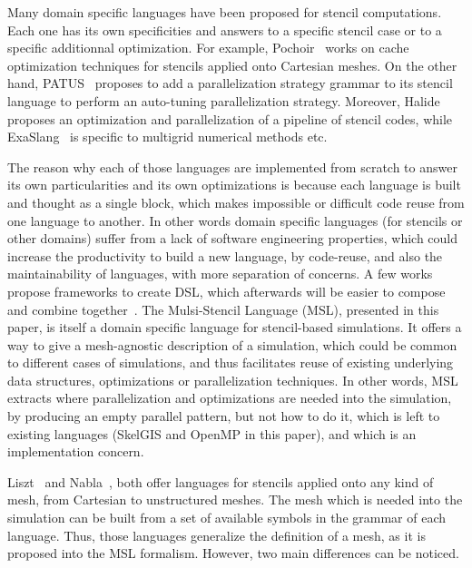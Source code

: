 Many domain specific languages have been proposed for stencil computations. Each one has its own specificities and answers to a specific stencil case or to a specific additionnal optimization. For example, Pochoir~\cite{spaaTangCKLL11} works on cache optimization techniques for stencils applied onto Cartesian meshes. On the other hand, PATUS~\cite{citeulike12258902} proposes to add a parallelization strategy grammar to its stencil language to perform an auto-tuning parallelization strategy. Moreover, Halide~\cite{Ragan-Kelley:2013:HLC:2491956.2462176}  proposes an optimization and parallelization of a pipeline of stencil codes, while ExaSlang~\cite{Schmitt:2014:EDL:2691166.2691171} is specific to multigrid numerical methods etc.

The reason why each of those languages are implemented from scratch to answer its own particularities and its own optimizations is because each language is built and thought as a single block, which makes impossible or difficult code reuse from one language to another. In other words domain specific languages (for stencils or other domains) suffer from a lack of software engineering properties, which could increase the productivity to build a new language, by code-reuse, and also the maintainability of languages, with more separation of concerns. A few works propose frameworks to create DSL, which afterwards will be easier to compose and combine together~\cite{Sujeeth:2013:CRC:2524984.2524988}. The Mulsi-Stencil Language (MSL), presented in this paper, is itself a domain specific language for stencil-based simulations. It offers a way to give a mesh-agnostic description of a simulation, which could be common to different cases of simulations, and thus facilitates reuse of existing underlying data structures, optimizations or parallelization techniques. In other words, MSL extracts where parallelization and optimizations are needed into the simulation, by producing an empty parallel pattern, but not how to do it, which is left to existing languages (SkelGIS and OpenMP in this paper), and which is an implementation concern.

Liszt~\cite{DeVito:2011:LDS:2063384.2063396} and Nabla~\cite{Camier:2015:IPP:2820083.2820107}, both offer languages for stencils applied onto any kind of mesh, from Cartesian to unstructured meshes. The mesh which is needed into the simulation can be built from a set of available symbols in the grammar of each language. Thus, those languages generalize the definition of a mesh, as it is proposed into the MSL formalism. 
However, two main differences can be noticed. 

